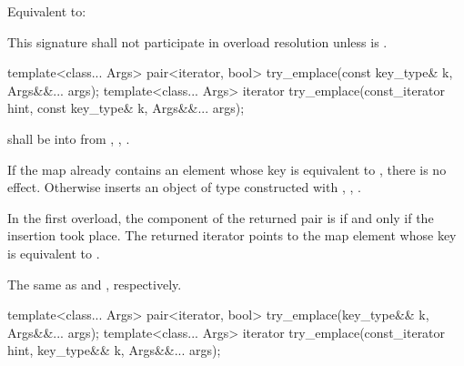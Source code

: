 \begin{itemdescr}
\pnum
\effects Equivalent to:

\pnum
\remarks This signature shall not participate in overload resolution
unless  is .
\end{itemdescr}

%
\begin{itemdecl}
template<class... Args>
  pair<iterator, bool> try_emplace(const key_type& k, Args&&... args);
template<class... Args>
  iterator try_emplace(const_iterator hint, const key_type& k, Args&&... args);
\end{itemdecl}

\begin{itemdescr}
\pnum
\requires
{} shall be  into 
from , ,
.

\pnum
\effects
If the map already contains an element
whose key is equivalent to ,
there is no effect.
Otherwise inserts an object of type 
constructed with , ,
.

\pnum
\returns
In the first overload,
the  component of the returned pair is 
if and only if the insertion took place.
The returned iterator points to the map element
whose key is equivalent to .

\pnum
\complexity
The same as  and ,
respectively.
\end{itemdescr}

%
\begin{itemdecl}
template<class... Args>
  pair<iterator, bool> try_emplace(key_type&& k, Args&&... args);
template<class... Args>
  iterator try_emplace(const_iterator hint, key_type&& k, Args&&... args);
\end{itemdecl}

